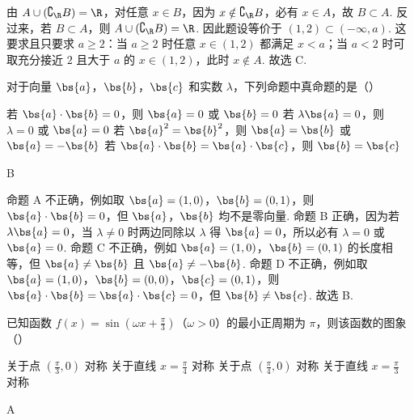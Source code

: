 \begin{solution}
由 \(A\cup(\complement_{\R}B)=\R\)，对任意 \(x\in B\)，因为 \(x\notin\complement_{\R}B\)，必有 \(x\in A\)，故 \(B\subset A\). 反过来，若 \(B\subset A\)，则 \(A\cup(\complement_{\R}B)=\R\). 因此题设等价于 \((1,2)\subset(-\infty,a)\). 这要求且只要求 \(a\geqslant2\)：当 \(a\geqslant2\) 时任意 \(x\in(1,2)\) 都满足 \(x<a\)；当 \(a<2\) 时可取充分接近 \(2\) 且大于 \(a\) 的 \(x\in(1,2)\)，此时 \(x\notin A\). 故选 C.
\end{solution}

\begin{problem}
对于向量 \(\bs{a}\)，\(\bs{b}\)，\(\bs{c}\) 和实数 \(\lambda\)，下列命题中真命题的是（\quad）

\choices
    {若 \(\bs{a} \cdot \bs{b} = 0\)，则 \(\bs{a} = 0\) 或 \(\bs{b} = 0\)}
    {若 \(\lambda\bs{a} = 0\)，则 \(\lambda = 0\) 或 \(\bs{a} = 0\)}
    {若 \(\bs{a}^2 = \bs{b}^2\)，则 \(\bs{a} = \bs{b}\) 或 \(\bs{a} = -\bs{b}\)}
    {若 \(\bs{a} \cdot \bs{b} = \bs{a} \cdot \bs{c}\)，则 \(\bs{b} = \bs{c}\)}
\end{problem}

\begin{answer}
B
\end{answer}

\begin{solution}
命题 A 不正确，例如取 \(\bs{a}=(1,0)\)，\(\bs{b}=(0,1)\)，则 \(\bs{a}\cdot\bs{b}=0\)，但 \(\bs{a}\)，\(\bs{b}\) 均不是零向量. 命题 B 正确，因为若 \(\lambda\bs{a}=0\)，当 \(\lambda\neq0\) 时两边同除以 \(\lambda\) 得 \(\bs{a}=0\)，所以必有 \(\lambda=0\) 或 \(\bs{a}=0\). 命题 C 不正确，例如 \(\bs{a}=(1,0)\)，\(\bs{b}=(0,1)\) 的长度相等，但 \(\bs{a}\neq\bs{b}\) 且 \(\bs{a}\neq-\bs{b}\). 命题 D 不正确，例如取 \(\bs{a}=(1,0)\)，\(\bs{b}=(0,0)\)，\(\bs{c}=(0,1)\)，则 \(\bs{a}\cdot\bs{b}=\bs{a}\cdot\bs{c}=0\)，但 \(\bs{b}\neq\bs{c}\). 故选 B.
\end{solution}

\begin{problem}
已知函数 \( f(x) = \sin \left( \omega x + \frac{\pi}{3} \right) \)（\(\omega > 0\)）的最小正周期为 \( \pi \)，则该函数的图象（\quad）

\choices
    {关于点 \(\left(\frac{\pi}{3}, 0\right)\) 对称}
    {关于直线 \(x = \frac{\pi}{4}\) 对称}
    {关于点 \(\left(\frac{\pi}{4}, 0\right)\) 对称}
    {关于直线 \(x = \frac{\pi}{3}\) 对称}
\end{problem}

\begin{answer}
A
\end{answer}


